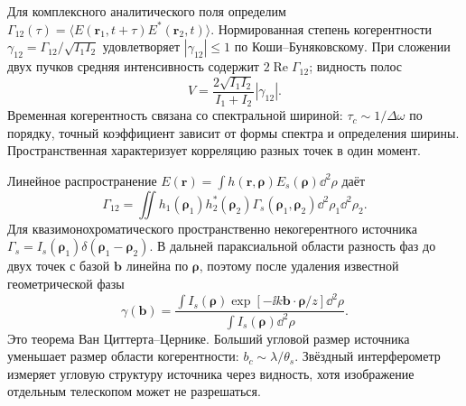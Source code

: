 
Для комплексного аналитического поля определим $\Gamma_{12}(\tau)=\langle E(\bm r_1,t+\tau)E^*(\bm r_2,t)\rangle$. Нормированная степень когерентности $\gamma_{12}=\Gamma_{12}/\sqrt{I_1I_2}$ удовлетворяет $|\gamma_{12}|\leq1$ по Коши–Буняковскому. При сложении двух пучков средняя интенсивность содержит $2\operatorname{Re}\Gamma_{12}$; видность полос
\begin{equation}
 V=\frac{2\sqrt{I_1I_2}}{I_1+I_2}|\gamma_{12}|.
\end{equation}
Временная когерентность связана со спектральной шириной: $\tau_c\sim1/\Delta\omega$ по порядку, точный коэффициент зависит от формы спектра и определения ширины. Пространственная характеризует корреляцию разных точек в один момент.

Линейное распространение $E(\bm r)=\int h(\bm r,\bm\rho)E_s(\bm\rho)\dd^2\rho$ даёт
\begin{equation}
 \Gamma_{12}=\iint h_1(\bm\rho_1)h_2^*(\bm\rho_2)
 \Gamma_s(\bm\rho_1,\bm\rho_2)\dd^2\rho_1\dd^2\rho_2.
\end{equation}
Для квазимонохроматического пространственно некогерентного источника $\Gamma_s=I_s(\bm\rho_1)\delta(\bm\rho_1-\bm\rho_2)$. В дальней параксиальной области разность фаз до двух точек с базой $\bm b$ линейна по $\bm\rho$, поэтому после удаления известной геометрической фазы
\begin{equation}
 \gamma(\bm b)=\frac{\int I_s(\bm\rho)\exp[-\ii k\bm b\cdot\bm\rho/z]\dd^2\rho}
 {\int I_s(\bm\rho)\dd^2\rho}.
\end{equation}
Это теорема Ван Циттерта–Цернике. Больший угловой размер источника уменьшает размер области когерентности: $b_c\sim\lambda/\theta_s$. Звёздный интерферометр измеряет угловую структуру источника через видность, хотя изображение отдельным телескопом может не разрешаться.

